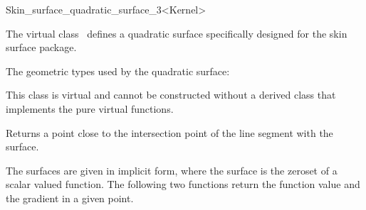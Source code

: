 
\ccRefPageBegin



\begin{ccRefClass}{Skin_surface_quadratic_surface_3<Kernel>}
\label{refSkinsurfacequadraticsurface}
\ccDefinition
  
The virtual class \ccRefName\ defines a quadratic surface specifically
designed for the skin surface package.


\ccTypes
The geometric types used by the quadratic surface:
\ccThreeToTwo

\ccGlue
{}
\ccGlue
{}
\ccGlue
{}
\ccGlue
{}

\ccCreation
{}  %

This class is virtual and cannot be constructed without a derived
class that implements the pure virtual functions.

\ccOperations
{}
\ccThreeToTwo

{Returns a point close to the intersection point of the line segment
   with the surface.}
%
\ccGlue 
%

The surfaces are given in implicit form, where the surface is the
zeroset of a scalar valued function. The following two functions
return the function value and the gradient in a given point.


\ccGlue {}

\ccSeeAlso
{}\\
\end{ccRefClass}

